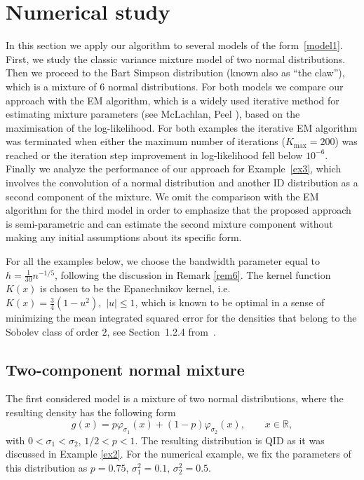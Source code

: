 \documentclass[a4paper,11pt]{article}
\theoremstyle{definition}
\newcommand{\R}{{\mathbb{R}}}
\newcommand{\1}{\mathbb{I}}
\def\R{\mathbb{R}}
\theoremstyle{remark}
\begin{document}
\section{Numerical study}\label{secnum}
In this section we apply our algorithm to several models of the form~\eqref{model1}. First, we study the classic variance mixture model of two normal distributions. Then we proceed to the Bart Simpson distribution (known also as ``the claw''), which is a mixture of $6$ normal distributions. For both models we compare our approach with the EM algorithm, which is a widely used iterative method for estimating mixture parameters (see McLachlan, Peel \cite{McLachlan}), based on the maximisation of the log-likelihood. For both examples the iterative EM algorithm was terminated when either the maximum number of iterations ($K_{\text{max}} = 200$) was reached or the iteration step improvement in log-likelihood fell below $10^{-6}$.  Finally we analyze the performance of our approach for Example~\ref{ex3}, which involves the convolution of a normal distribution and another ID distribution as a second component of the mixture. We omit the comparison with the EM algorithm for the third model in order to emphasize that the proposed approach is semi-parametric and can estimate the second mixture component without making any initial assumptions about its specific form.

For all the examples below,  we choose the bandwidth parameter equal to $h = \frac{1}{30} n^{-1/5}$, following the discussion in Remark \ref{rem6}. The kernel function $K(x)$ is chosen to be the Epanechnikov kernel, i.e. $K(x) = \frac{3}{4}(1 - u^2), \,\,|u| \leq 1$, which is known to be optimal in a sense of minimizing the mean integrated squared error for the densities that belong to the Sobolev class of order $2$, see Section~1.2.4 from~\cite{Tsybakov}.

\subsection{Two-component normal mixture}
The first considered model is a mixture of two normal distributions, where the resulting density has the following form
\begin{equation*}
    g(x) = p\varphi_{\sigma_1}(x) + (1 - p)\varphi_{\sigma_2}(x), \qquad x \in \R,
\end{equation*}
with $0 < \sigma_1 < \sigma_2$, $1/2 < p < 1$.
The resulting distribution is QID as it was discussed in Example \ref{ex2}. For the numerical example, we fix the parameters of this distribution as $p = 0.75, \, \sigma_1^2 = 0.1, \, \sigma^2_2 = 0.5$.
\end{document}
